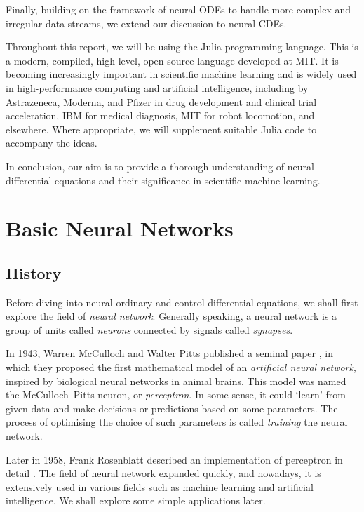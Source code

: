 \documentclass[a4paper,11pt,titlepage]{article}
\theoremstyle{definition}
\theoremstyle{plain}
\theoremstyle{remark}
\begin{document}
Finally, building on the framework of neural ODEs to handle more complex and irregular data streams, we extend our discussion to neural CDEs.

Throughout this report, we will be using the Julia programming language. This is a modern, compiled, high-level, open-source language developed at MIT. It is becoming increasingly important in scientific machine learning and is widely used in high-performance computing and artificial intelligence, including by Astrazeneca, Moderna, and Pfizer in drug development and clinical trial acceleration, IBM for medical diagnosis, MIT for robot locomotion, and elsewhere. Where appropriate, we will supplement suitable Julia code to accompany the ideas.

In conclusion, our aim is to provide a thorough understanding of neural differential equations and their significance in scientific machine learning.

\pagebreak
\section{Basic Neural Networks}

\label{sec:neuralnetworks}
\subsection{History}

Before diving into neural ordinary and control differential equations, we shall first explore the field of \textit{neural network}. Generally speaking, a neural network is a group of units called \textit{neurons} connected by signals called \textit{synapses}.

In 1943, Warren McCulloch and Walter Pitts published a seminal paper \cite{McCulloch1943}, in which they proposed the first mathematical model of an \textit{artificial neural network}, inspired by biological neural networks in animal brains. This model was named the McCulloch–Pitts neuron, or \textit{perceptron}. In some sense, it could ‘learn’ from given data and make decisions or predictions based on some parameters. The process of optimising the choice of such parameters is called \textit{training} the neural network.

Later in 1958, Frank Rosenblatt described an implementation of perceptron in detail \cite{Rosenblatt1958}. The field of neural network expanded quickly, and nowadays, it is extensively used in various fields such as machine learning and artificial intelligence. We shall explore some simple applications later.
\end{document}
